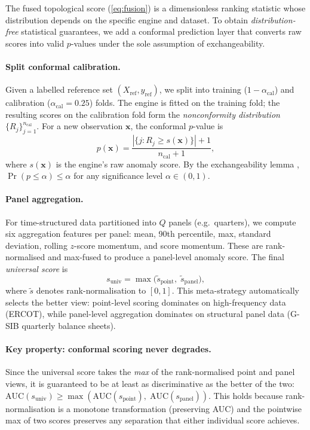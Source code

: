 \documentclass[final]{siamltex}
\begin{document}
The fused topological score (\ref{eq:fusion}) is a dimensionless
ranking statistic whose distribution depends on the specific
engine and dataset.  To obtain \emph{distribution-free}
statistical guarantees, we add a conformal prediction layer
that converts raw scores into valid $p$-values under the sole
assumption of exchangeability.

\paragraph{Split conformal calibration.}
Given a labelled reference set $(X_{\mathrm{ref}},y_{\mathrm{ref}})$,
we split into training ($1 - \alpha_{\mathrm{cal}}$) and calibration
($\alpha_{\mathrm{cal}} = 0.25$) folds.  The engine is fitted on
the training fold; the resulting scores on the calibration fold
form the \emph{nonconformity distribution}
$\{R_j\}_{j=1}^{n_{\mathrm{cal}}}$.  For a new observation
$\mathbf{x}$, the conformal $p$-value is
\begin{equation}\label{eq:conformal_pval}
  p(\mathbf{x}) = \frac{|\{j : R_j \ge s(\mathbf{x})\}| + 1}
  {n_{\mathrm{cal}} + 1},
\end{equation}
where $s(\mathbf{x})$ is the engine's raw anomaly score.
By the exchangeability lemma \cite{vovk2005algorithmic},
$\Pr(p \le \alpha) \le \alpha$ for any significance level
$\alpha \in (0,1)$.

\paragraph{Panel aggregation.}
For time-structured data partitioned into $Q$ panels
(e.g.\ quarters), we compute six aggregation features per panel:
mean, 90th percentile, max, standard deviation, rolling $z$-score
momentum, and score momentum.  These are rank-normalised and
max-fused to produce a panel-level anomaly score.  The final
\emph{universal score} is
\begin{equation}\label{eq:universal}
  s_{\mathrm{univ}} = \max\bigl(\tilde{s}_{\mathrm{point}},\;
  \tilde{s}_{\mathrm{panel}}\bigr),
\end{equation}
where $\tilde{s}$ denotes rank-normalisation to $[0,1]$.
This meta-strategy automatically selects the better view:
point-level scoring dominates on high-frequency data (ERCOT),
while panel-level aggregation dominates on structural panel data
(G-SIB quarterly balance sheets).

\paragraph{Key property: conformal scoring never degrades.}
Since the universal score takes the \emph{max} of the
rank-normalised point and panel views, it is guaranteed to
be at least as discriminative as the better of the two:
$\mathrm{AUC}(s_{\mathrm{univ}}) \ge
\max(\mathrm{AUC}(s_{\mathrm{point}}),\;
\mathrm{AUC}(s_{\mathrm{panel}}))$.
This holds because rank-normalisation is a monotone
transformation (preserving AUC) and the pointwise max of two
scores preserves any separation that either individual score
achieves.
\end{document}
